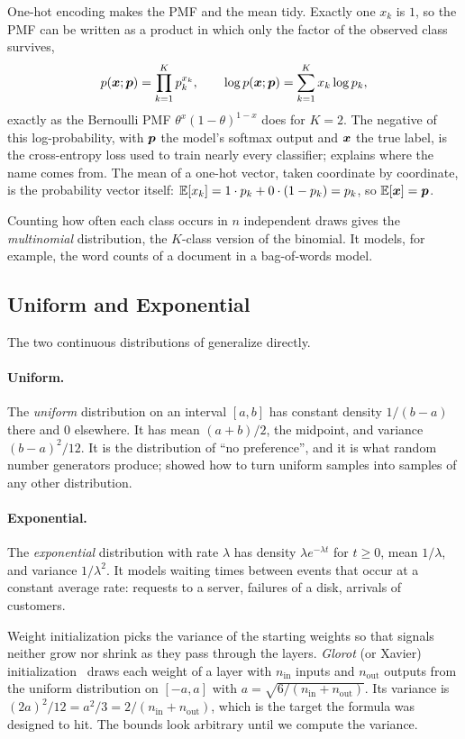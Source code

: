 One-hot encoding makes the PMF and the mean tidy. Exactly one $x_k$ is
$1$, so the PMF can be written as a product in which only the factor of
the observed class survives,
\[
  p(\bm{x}; \bm{p}) = \prod_{k=1}^K p_k^{x_k},
  \qquad
  \log p(\bm{x}; \bm{p}) = \sum_{k=1}^K x_k \log p_k ,
\]
exactly as the Bernoulli PMF $\theta^x (1 - \theta)^{1-x}$ does for $K =
2$. The negative of this log-probability, with $\bm{p}$ the model's
softmax output and $\bm{x}$ the true label, is the cross-entropy loss
used to train nearly every classifier;  explains where
the name comes from. The mean of a one-hot vector, taken coordinate by
coordinate, is the probability vector itself: $\mathbb{E}[x_k] = 1 \cdot p_k +
0 \cdot (1 - p_k) = p_k$, so $\mathbb{E}[\bm{x}] = \bm{p}$.

Counting how often each class occurs in $n$ independent draws gives the
\emph{multinomial} distribution, the $K$-class version of the binomial.
It models, for example, the word counts of a document in a
bag-of-words model.

\subsection{Uniform and Exponential}
\label{sec:ch05-uniform-exp}

The two continuous distributions of 
generalize directly.

\paragraph{Uniform.}
The \emph{uniform} distribution on an interval $[a, b]$ has constant
density $1/(b - a)$ there and $0$ elsewhere. It has mean $(a + b)/2$,
the midpoint, and variance $(b - a)^2/12$. It is the distribution of
``no preference'', and it is what random number generators produce;
 showed how to turn uniform samples into samples of
any other distribution.

\paragraph{Exponential.}
The \emph{exponential} distribution with rate $\lambda$ has density
$\lambda e^{-\lambda t}$ for $t \ge 0$, mean $1/\lambda$, and variance
$1/\lambda^2$. It models waiting times between events that occur at a
constant average rate: requests to a server, failures of a disk, arrivals
of customers.

\begin{aibox}
  Weight initialization picks the variance of the starting weights so
  that signals neither grow nor shrink as they pass through the layers.
  \emph{Glorot} (or Xavier) initialization~\cite{glorot2010understanding}
  draws each weight of a layer
  with $n_{\text{in}}$ inputs and $n_{\text{out}}$ outputs from the
  uniform distribution on $[-a, a]$ with $a = \sqrt{6/(n_{\text{in}} +
  n_{\text{out}})}$. Its variance is $(2a)^2/12 = a^2/3 = 2/(n_{\text{in}}
  + n_{\text{out}})$, which is the target the formula was designed to
  hit. The bounds look arbitrary until we compute the variance.
\end{aibox}

